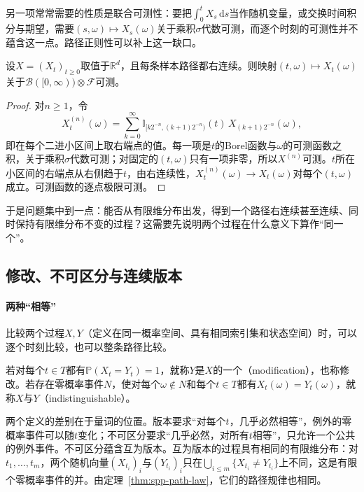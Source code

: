 另一项常常需要的性质是联合可测性：要把$\int_0^tX_s\,\mathrm ds$当作随机变量，或交换时间积分与期望，需要$(s,\omega)\mapsto X_s(\omega)$关于乘积$\sigma$代数可测，而逐个时刻的可测性并不蕴含这一点。路径正则性可以补上这一缺口。

\begin{theorem}[右连续路径的联合可测性]
\label{thm:spp-joint-measurability}
设$X=(X_t)_{t\ge0}$取值于$\mathbb R^d$，且每条样本路径都右连续。则映射$(t,\omega)\mapsto X_t(\omega)$关于$\mathcal B([0,\infty))\otimes\mathcal F$可测。
\end{theorem}

\begin{proof}
对$n\ge1$，令
\[
  X^{(n)}_t(\omega)=\sum_{k=0}^\infty\mathbb I_{[k2^{-n},(k+1)2^{-n})}(t)\,X_{(k+1)2^{-n}}(\omega),
\]
即在每个二进小区间上取右端点的值。每一项是$t$的Borel函数与$\omega$的可测函数之积，关于乘积$\sigma$代数可测；对固定的$(t,\omega)$只有一项非零，所以$X^{(n)}$可测。$t$所在小区间的右端点从右侧趋于$t$，由右连续性，$X^{(n)}_t(\omega)\to X_t(\omega)$对每个$(t,\omega)$成立。可测函数的逐点极限可测。
\end{proof}

于是问题集中到一点：能否从有限维分布出发，得到一个路径右连续甚至连续、同时保持有限维分布不变的过程？这需要先说明两个过程在什么意义下算作“同一个”。

\subsection{修改、不可区分与连续版本}
\label{sec:spp-versions}

\paragraph{两种“相等”}
比较两个过程$X,Y$（定义在同一概率空间、具有相同索引集和状态空间）时，可以逐个时刻比较，也可以整条路径比较。

\begin{definition}[版本与不可区分]
\label{def:spp-modification}
若对每个$t\in T$都有$\mathbb P(X_t=Y_t)=1$，就称$Y$是$X$的一个（modification），也称修改。若存在零概率事件$N$，使对每个$\omega\notin N$和每个$t\in T$都有$X_t(\omega)=Y_t(\omega)$，就称$X$与$Y$（indistinguishable）。
\end{definition}

两个定义的差别在于量词的位置。版本要求“对每个$t$，几乎必然相等”，例外的零概率事件可以随$t$变化；不可区分要求“几乎必然，对所有$t$相等”，只允许一个公共的例外事件。不可区分蕴含互为版本。互为版本的过程具有相同的有限维分布：对$t_1,\ldots,t_m$，两个随机向量$(X_{t_i})_i$与$(Y_{t_i})_i$只在$\bigcup_{i\le m}\{X_{t_i}\ne Y_{t_i}\}$上不同，这是有限个零概率事件的并。由定理~\ref{thm:spp-path-law}，它们的路径规律也相同。

